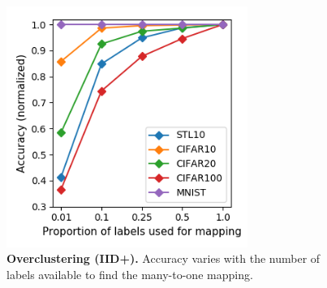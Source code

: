 \begin{figure}[h]
\centering
\includegraphics[width=0.7\textwidth]{experiments2_files/render_vary_num_labels_all.png}
\caption{\textbf{Overclustering (IID+).} Accuracy varies with the number of labels available to find the many-to-one mapping.} \label{f:iid_plus_num_labels}
\end{figure}